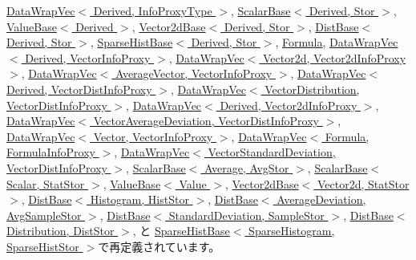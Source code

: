 \hyperlink{classStats_1_1DataWrapVec_ad20897c5c8bd47f5d4005989bead0e55}{DataWrapVec$<$ Derived, InfoProxyType $>$}, \hyperlink{classStats_1_1ScalarBase_ad20897c5c8bd47f5d4005989bead0e55}{ScalarBase$<$ Derived, Stor $>$}, \hyperlink{classStats_1_1ValueBase_ad20897c5c8bd47f5d4005989bead0e55}{ValueBase$<$ Derived $>$}, \hyperlink{classStats_1_1Vector2dBase_ad20897c5c8bd47f5d4005989bead0e55}{Vector2dBase$<$ Derived, Stor $>$}, \hyperlink{classStats_1_1DistBase_ad20897c5c8bd47f5d4005989bead0e55}{DistBase$<$ Derived, Stor $>$}, \hyperlink{classStats_1_1SparseHistBase_ad20897c5c8bd47f5d4005989bead0e55}{SparseHistBase$<$ Derived, Stor $>$}, \hyperlink{classStats_1_1Formula_ad20897c5c8bd47f5d4005989bead0e55}{Formula}, \hyperlink{classStats_1_1DataWrapVec_ad20897c5c8bd47f5d4005989bead0e55}{DataWrapVec$<$ Derived, VectorInfoProxy $>$}, \hyperlink{classStats_1_1DataWrapVec_ad20897c5c8bd47f5d4005989bead0e55}{DataWrapVec$<$ Vector2d, Vector2dInfoProxy $>$}, \hyperlink{classStats_1_1DataWrapVec_ad20897c5c8bd47f5d4005989bead0e55}{DataWrapVec$<$ AverageVector, VectorInfoProxy $>$}, \hyperlink{classStats_1_1DataWrapVec_ad20897c5c8bd47f5d4005989bead0e55}{DataWrapVec$<$ Derived, VectorDistInfoProxy $>$}, \hyperlink{classStats_1_1DataWrapVec_ad20897c5c8bd47f5d4005989bead0e55}{DataWrapVec$<$ VectorDistribution, VectorDistInfoProxy $>$}, \hyperlink{classStats_1_1DataWrapVec_ad20897c5c8bd47f5d4005989bead0e55}{DataWrapVec$<$ Derived, Vector2dInfoProxy $>$}, \hyperlink{classStats_1_1DataWrapVec_ad20897c5c8bd47f5d4005989bead0e55}{DataWrapVec$<$ VectorAverageDeviation, VectorDistInfoProxy $>$}, \hyperlink{classStats_1_1DataWrapVec_ad20897c5c8bd47f5d4005989bead0e55}{DataWrapVec$<$ Vector, VectorInfoProxy $>$}, \hyperlink{classStats_1_1DataWrapVec_ad20897c5c8bd47f5d4005989bead0e55}{DataWrapVec$<$ Formula, FormulaInfoProxy $>$}, \hyperlink{classStats_1_1DataWrapVec_ad20897c5c8bd47f5d4005989bead0e55}{DataWrapVec$<$ VectorStandardDeviation, VectorDistInfoProxy $>$}, \hyperlink{classStats_1_1ScalarBase_ad20897c5c8bd47f5d4005989bead0e55}{ScalarBase$<$ Average, AvgStor $>$}, \hyperlink{classStats_1_1ScalarBase_ad20897c5c8bd47f5d4005989bead0e55}{ScalarBase$<$ Scalar, StatStor $>$}, \hyperlink{classStats_1_1ValueBase_ad20897c5c8bd47f5d4005989bead0e55}{ValueBase$<$ Value $>$}, \hyperlink{classStats_1_1Vector2dBase_ad20897c5c8bd47f5d4005989bead0e55}{Vector2dBase$<$ Vector2d, StatStor $>$}, \hyperlink{classStats_1_1DistBase_ad20897c5c8bd47f5d4005989bead0e55}{DistBase$<$ Histogram, HistStor $>$}, \hyperlink{classStats_1_1DistBase_ad20897c5c8bd47f5d4005989bead0e55}{DistBase$<$ AverageDeviation, AvgSampleStor $>$}, \hyperlink{classStats_1_1DistBase_ad20897c5c8bd47f5d4005989bead0e55}{DistBase$<$ StandardDeviation, SampleStor $>$}, \hyperlink{classStats_1_1DistBase_ad20897c5c8bd47f5d4005989bead0e55}{DistBase$<$ Distribution, DistStor $>$}, と \hyperlink{classStats_1_1SparseHistBase_ad20897c5c8bd47f5d4005989bead0e55}{SparseHistBase$<$ SparseHistogram, SparseHistStor $>$}で再定義されています。


